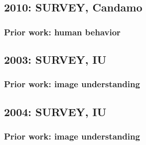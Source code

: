 \subsection{2010: SURVEY, Candamo}
\begin{frame}
\frametitle{Prior work: human behavior}
\framesubtitle{}
\mypagenum
{}
\end{frame}


\subsection{2003: SURVEY, IU}
\begin{frame}
\frametitle{Prior work: image understanding}
\framesubtitle{}
\mypagenum
{}
\end{frame}



\subsection{2004: SURVEY, IU}
\begin{frame}
\frametitle{Prior work: image understanding}
\framesubtitle{}
\mypagenum
{}
\end{frame}


\printbibliography



